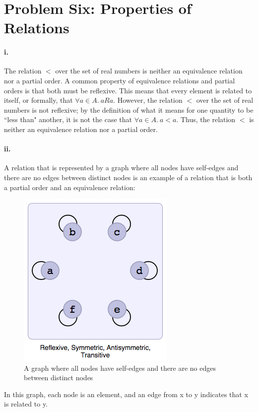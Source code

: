 \documentclass[10pt,letter]{article}
\begin{document}
\pagebreak
\section*{Problem Six: Properties of Relations}

\paragraph{i.} The relation $<$ over the set of real numbers is neither an equivalence relation nor a partial order. A common property of equivalence relations and partial orders is that both must be reflexive. This means that every element is related to itself, or formally, that $\forall a \in A.\ aRa$. However, the relation $<$ over the set of real numbers is not reflexive; by the definition of what it means for one quantity to be ``less than" another, it is not the case that $\forall a \in A.\ a<a$. Thus, the relation $<$ is neither an equivalence relation nor a partial order. 

\paragraph{ii.} A relation that is represented by a graph where all nodes have self-edges and there are no edges between distinct nodes is an example of a relation that is both a partial order and an equivalence relation:

\begin{figure}[h]
\centering
  \includegraphics[width=0.45\linewidth]{hw4_6ii.png}
  \caption{A graph where all nodes have self-edges and there are no edges between distinct nodes}
  \label{fig:q6ii}
\end{figure}

In this graph, each node is an element, and an edge from x to y indicates that x is related to y. 
\end{document}
